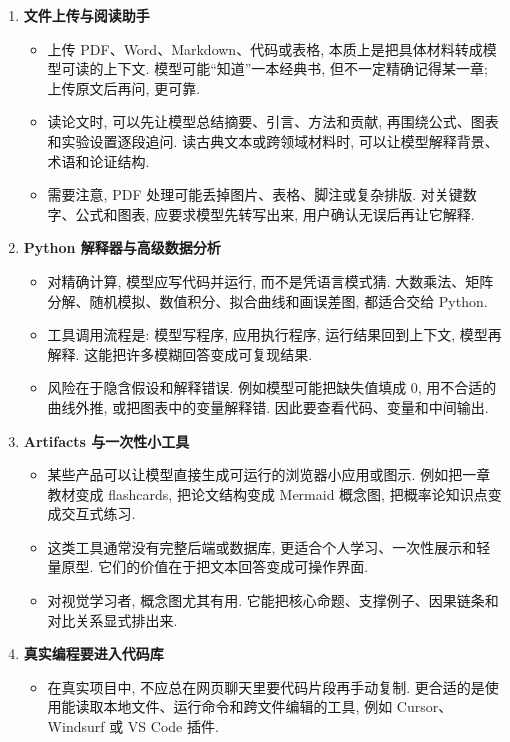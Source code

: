 \documentclass{../nndlcourse}
\begin{document}
\begin{enumerate}
  \item \textbf{文件上传与阅读助手}
    \begin{itemize}
      \item 上传 PDF、Word、Markdown、代码或表格, 本质上是把具体材料转成模型可读的上下文. 模型可能“知道”一本经典书, 但不一定精确记得某一章; 上传原文后再问, 更可靠.
      \item 读论文时, 可以先让模型总结摘要、引言、方法和贡献, 再围绕公式、图表和实验设置逐段追问. 读古典文本或跨领域材料时, 可以让模型解释背景、术语和论证结构.
      \item 需要注意, PDF 处理可能丢掉图片、表格、脚注或复杂排版. 对关键数字、公式和图表, 应要求模型先转写出来, 用户确认无误后再让它解释.
    \end{itemize}
  \item \textbf{Python 解释器与高级数据分析}
    \begin{itemize}
      \item 对精确计算, 模型应写代码并运行, 而不是凭语言模式猜. 大数乘法、矩阵分解、随机模拟、数值积分、拟合曲线和画误差图, 都适合交给 Python.
      \item 工具调用流程是: 模型写程序, 应用执行程序, 运行结果回到上下文, 模型再解释. 这能把许多模糊回答变成可复现结果.
      \item 风险在于隐含假设和解释错误. 例如模型可能把缺失值填成 0, 用不合适的曲线外推, 或把图表中的变量解释错. 因此要查看代码、变量和中间输出.
    \end{itemize}
  \item \textbf{Artifacts 与一次性小工具}
    \begin{itemize}
      \item 某些产品可以让模型直接生成可运行的浏览器小应用或图示. 例如把一章教材变成 flashcards, 把论文结构变成 Mermaid 概念图, 把概率论知识点变成交互式练习.
      \item 这类工具通常没有完整后端或数据库, 更适合个人学习、一次性展示和轻量原型. 它们的价值在于把文本回答变成可操作界面.
      \item 对视觉学习者, 概念图尤其有用. 它能把核心命题、支撑例子、因果链条和对比关系显式排出来.
    \end{itemize}
  \item \textbf{真实编程要进入代码库}
    \begin{itemize}
      \item 在真实项目中, 不应总在网页聊天里要代码片段再手动复制. 更合适的是使用能读取本地文件、运行命令和跨文件编辑的工具, 例如 Cursor、Windsurf 或 VS Code 插件.

\end{itemize}
\end{enumerate}
\end{document}
